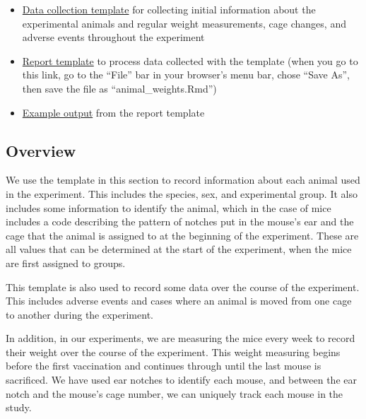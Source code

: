 \documentclass[
]{book}
\providecommand{\tightlist}{%
  \setlength{\itemsep}{0pt}\setlength{\parskip}{0pt}}
\begin{document}
\begin{itemize}
\tightlist
\item
  \href{https://github.com/csu-impactb/CODING-TEAM-BOOKDOWN-/raw/main/templates/data_collection_templates/body_weights_template.xlsx}{Data collection template} for collecting initial information about the experimental animals and regular weight measurements, cage changes, and adverse events throughout the experiment
\item
  \href{https://raw.githubusercontent.com/csu-impactb/CODING-TEAM-BOOKDOWN-/main/templates/report_templates/animal_weights.Rmd}{Report template} to process data collected with the template (when you go to this link, go to the ``File'' bar in your browser's menu bar, chose ``Save As'', then save the file as ``animal\_weights.Rmd'')
\item
  \href{https://github.com/csu-impactb/CODING-TEAM-BOOKDOWN-/raw/main/templates/report_templates/animal_weights.docx}{Example output} from the report template
\end{itemize}

\hypertarget{overview-1}{%
\subsection{Overview}\label{overview-1}}

We use the template in this section to record information about each animal
used in the experiment. This includes the species, sex, and experimental group.
It also includes some information to identify the animal, which in the case
of mice includes a code describing the pattern of notches put in the mouse's
ear and the cage that the animal is assigned to at the beginning of the
experiment. These are all values that can be determined at the start of the
experiment, when the mice are first assigned to groups.

This template is also used to record some data over the course of the
experiment. This includes adverse events and cases where an animal is moved from
one cage to another during the experiment.

In addition, in our experiments, we are measuring the mice every week to record
their weight over the course of the experiment. This weight measuring begins
before the first vaccination and continues through until the last mouse is
sacrificed. We have used ear notches to identify each mouse, and between the ear
notch and the mouse's cage number, we can uniquely track each mouse in the
study.
\end{document}
